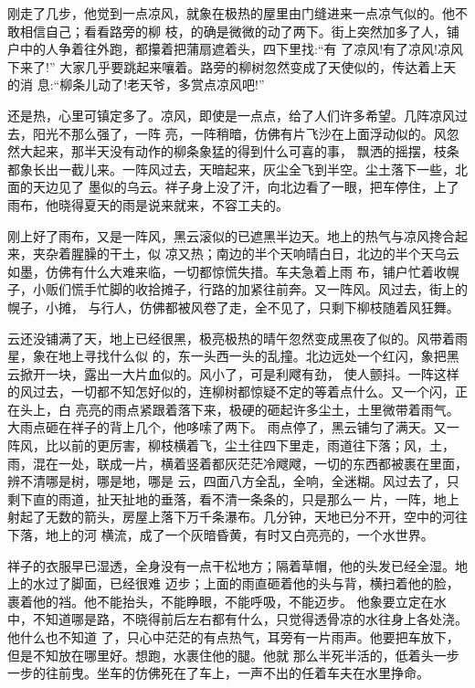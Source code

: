 \documentclass[11pt,a4paper,onecolumn]{article}
\begin{document}
刚走了几步，他觉到一点凉风，就象在极热的屋里由门缝进来一点凉气似的。他不敢相信自己；看看路旁的柳
枝，的确是微微的动了两下。街上突然加多了人，铺户中的人争着往外跑，都攥着把蒲扇遮着头，四下里找:``有
了凉风!有了凉风!凉风下来了!'' 大家几乎要跳起来嚷着。路旁的柳树忽然变成了天使似的，传达着上天的消
息:``柳条儿动了!老天爷，多赏点凉风吧!''

还是热，心里可镇定多了。凉风，即使是一点点，给了人们许多希望。几阵凉风过去，阳光不那么强了，一阵
亮，一阵稍暗，仿佛有片飞沙在上面浮动似的。风忽然大起来，那半天没有动作的柳条象猛的得到什么可喜的事，
飘洒的摇摆，枝条都象长出一截儿来。一阵风过去，天暗起来，灰尘全飞到半空。尘土落下一些，北面的天边见了
墨似的乌云。祥子身上没了汗，向北边看了一眼，把车停住，上了雨布，他晓得夏天的雨是说来就来，不容工夫的。

刚上好了雨布，又是一阵风，黑云滚似的已遮黑半边天。地上的热气与凉风搀合起来，夹杂着腥臊的干土，似
凉又热；南边的半个天响晴白日，北边的半个天乌云如墨，仿佛有什么大难来临，一切都惊慌失措。车夫急着上雨
布，铺户忙着收幌子，小贩们慌手忙脚的收拾摊子，行路的加紧往前奔。又一阵风。风过去，街上的幌子，小摊，
与行人，仿佛都被风卷了走，全不见了，只剩下柳枝随着风狂舞。

云还没铺满了天，地上已经很黑，极亮极热的晴午忽然变成黑夜了似的。风带着雨星，象在地上寻找什么似
的，东一头西一头的乱撞。北边远处一个红闪，象把黑云掀开一块，露出一大片血似的。风小了，可是利飕有劲，
使人颤抖。一阵这样的风过去，一切都不知怎好似的，连柳树都惊疑不定的等着点什么。又一个闪，正在头上，白
亮亮的雨点紧跟着落下来，极硬的砸起许多尘土，土里微带着雨气。大雨点砸在祥子的背上几个，他哆嗦了两下。
雨点停了，黑云铺匀了满天。又一阵风，比以前的更厉害，柳枝横着飞，尘土往四下里走，雨道往下落；风，土，
雨，混在一处，联成一片，横着竖着都灰茫茫冷飕飕，一切的东西都被裹在里面，辨不清哪是树，哪是地，哪是
云，四面八方全乱，全响，全迷糊。风过去了，只剩下直的雨道，扯天扯地的垂落，看不清一条条的，只是那么一
片，一阵，地上射起了无数的箭头，房屋上落下万千条瀑布。几分钟，天地已分不开，空中的河往下落，地上的河
横流，成了一个灰暗昏黄，有时又白亮亮的，一个水世界。

祥子的衣服早已湿透，全身没有一点干松地方；隔着草帽，他的头发已经全湿。地上的水过了脚面，已经很难
迈步；上面的雨直砸着他的头与背，横扫着他的脸，裹着他的裆。他不能抬头，不能睁眼，不能呼吸，不能迈步。
他象要立定在水中，不知道哪是路，不晓得前后左右都有什么，只觉得透骨凉的水往身上各处浇。他什么也不知道
了，只心中茫茫的有点热气，耳旁有一片雨声。他要把车放下，但是不知放在哪里好。想跑，水裹住他的腿。他就
那么半死半活的，低着头一步一步的往前曳。坐车的仿佛死在了车上，一声不出的任着车夫在水里挣命。
\end{document}
